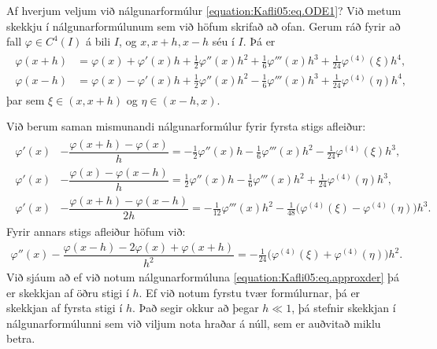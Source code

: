 \documentclass[a4paper,10pt,icelandic]{sphinxmanual}
\begin{document}
Af hverjum veljum við nálgunarformúlur \eqref{equation:Kafli05:eq.ODE1}?
Við metum skekkju í nálgunarformúlunum sem við höfum skrifað að ofan.
Gerum ráð fyrir að fall \(\varphi\in C^4(I)\) á bili \(I\), og \(x, x+h, x-h\) séu í \(I\). Þá er
\begin{equation*}
\begin{split}\begin{aligned}
\varphi(x+h)&=\varphi(x)+\varphi'(x)h+\tfrac 12 \varphi''(x)h^2
+\tfrac 16 \varphi'''(x)h^3+\tfrac 1{24}\varphi^{(4)}(\xi)h^4,\\
\varphi(x-h)&=\varphi(x)-\varphi'(x)h+\tfrac 12 \varphi''(x)h^2
-\tfrac 16 \varphi'''(x)h^3+\tfrac 1{24}\varphi^{(4)}(\eta) h^4,\end{aligned}\end{split}
\end{equation*}
þar sem \(\xi \in (x,x+h)\) og \(\eta \in (x-h,x)\).

Við berum saman mismunandi nálgunarformúlur fyrir fyrsta stigs afleiður:
\begin{equation*}
\begin{split}\begin{aligned}
\varphi'(x)&-\dfrac{\varphi(x+h)-\varphi(x)}h
=-\tfrac 12 \varphi''(x)h
-\tfrac 16 \varphi'''(x)h^2-\tfrac 1{24}\varphi^{(4)}(\xi)h^3,\\
\varphi'(x)&-\dfrac{\varphi(x)-\varphi(x-h)}h
=\tfrac 12 \varphi''(x)h
-\tfrac 16 \varphi'''(x)h^2+\tfrac 1{24}\varphi^{(4)}(\eta)h^3,\\
\varphi'(x)&-\dfrac{\varphi(x+h)-\varphi(x-h)}{2h}
=-\tfrac 1{12}\varphi'''(x)h^2-\tfrac 1{48}
\big(\varphi^{(4)}(\xi)-\varphi^{(4)}(\eta)\big) h^3.
\end{aligned}\end{split}
\end{equation*}
Fyrir annars stigs afleiður höfum við:
\begin{equation*}
\begin{split}\varphi''(x)-\dfrac{\varphi(x-h)-2\varphi(x)+\varphi(x+h)}{h^2}
=-\tfrac 1{24}
\big(\varphi^{(4)}(\xi)+\varphi^{(4)}(\eta)\big) h^2.\end{split}
\end{equation*}
Við sjáum að ef við notum nálgunarformúluna \eqref{equation:Kafli05:eq.approxder} þá er skekkjan af öðru stigi í \(h\). Ef við notum fyrstu tvær formúlurnar, þá er skekkjan af fyrsta stigi í \(h\). Það segir okkur að þegar \(h \ll 1\), þá stefnir skekkjan í nálgunarformúlunni sem við viljum nota hraðar á núll, sem er auðvitað miklu betra.
\end{document}
